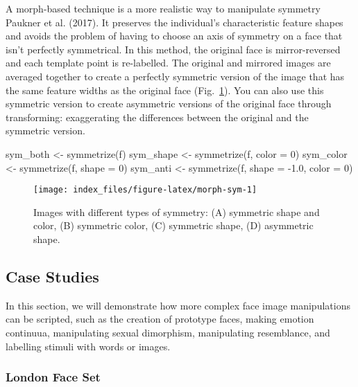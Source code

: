 \documentclass[
  doc,floatsintext]{apa6}
\newenvironment{Shaded}{\begin{snugshade}}{\end{snugshade}}
\newcommand{\AttributeTok}[1]{\textcolor[rgb]{0.77,0.63,0.00}{#1}}
\newcommand{\DecValTok}[1]{\textcolor[rgb]{0.00,0.00,0.81}{#1}}
\newcommand{\FloatTok}[1]{\textcolor[rgb]{0.00,0.00,0.81}{#1}}
\newcommand{\FunctionTok}[1]{\textcolor[rgb]{0.00,0.00,0.00}{#1}}
\newcommand{\NormalTok}[1]{#1}
\newcommand{\OtherTok}[1]{\textcolor[rgb]{0.56,0.35,0.01}{#1}}
\newcommand{\SpecialCharTok}[1]{\textcolor[rgb]{0.00,0.00,0.00}{#1}}
\begin{document}
A morph-based technique is a more realistic way to manipulate symmetry Paukner et al. (2017). It preserves the individual's characteristic feature shapes and avoids the problem of having to choose an axis of symmetry on a face that isn't perfectly symmetrical. In this method, the original face is mirror-reversed and each template point is re-labelled. The original and mirrored images are averaged together to create a perfectly symmetric version of the image that has the same feature widths as the original face (Fig.~\ref{fig:morph-sym}). You can also use this symmetric version to create asymmetric versions of the original face through transforming: exaggerating the differences between the original and the symmetric version.

\begin{Shaded}
\begin{Highlighting}[]
\NormalTok{sym\_both }\OtherTok{\textless{}{-}} \FunctionTok{symmetrize}\NormalTok{(f)}
\NormalTok{sym\_shape }\OtherTok{\textless{}{-}} \FunctionTok{symmetrize}\NormalTok{(f, }\AttributeTok{color =} \DecValTok{0}\NormalTok{)}
\NormalTok{sym\_color }\OtherTok{\textless{}{-}} \FunctionTok{symmetrize}\NormalTok{(f, }\AttributeTok{shape =} \DecValTok{0}\NormalTok{)}
\NormalTok{sym\_anti }\OtherTok{\textless{}{-}} \FunctionTok{symmetrize}\NormalTok{(f, }\AttributeTok{shape =} \SpecialCharTok{{-}}\FloatTok{1.0}\NormalTok{, }\AttributeTok{color =} \DecValTok{0}\NormalTok{)}
\end{Highlighting}
\end{Shaded}

\begin{figure}
\texttt{[image: index\_files/figure-latex/morph-sym-1]} \caption{Images with different types of symmetry: (A) symmetric shape and color, (B) symmetric color, (C) symmetric shape, (D) asymmetric shape.}\label{fig:morph-sym}
\end{figure}

\hypertarget{case-studies}{%
\subsection{Case Studies}\label{case-studies}}

In this section, we will demonstrate how more complex face image manipulations can be scripted, such as the creation of prototype faces, making emotion continuua, manipulating sexual dimorphism, manipulating resemblance, and labelling stimuli with words or images.

\hypertarget{london-face-set}{%
\subsubsection{London Face Set}\label{london-face-set}}
\end{document}
